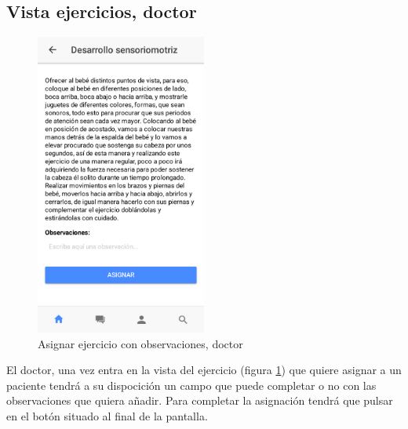 \subsection{Vista ejercicios, doctor}
\begin{figure}[!h]
    \centering
    \includegraphics[width=0.5\textwidth]{images/screenshots/Doctor-anadir-observacion.png}
    \caption{Asignar ejercicio con observaciones, doctor}
    \label{asignar-ejercicio-con-observaciones}
\end{figure}

El doctor, una vez entra en la vista del ejercicio
(figura \ref{asignar-ejercicio-con-observaciones}) que quiere asignar a un
paciente tendrá a su dispocición un campo que puede completar o no con las
observaciones que quiera añadir. Para completar la asignación tendrá que
pulsar en el botón situado al final de la pantalla.
\clearpage

